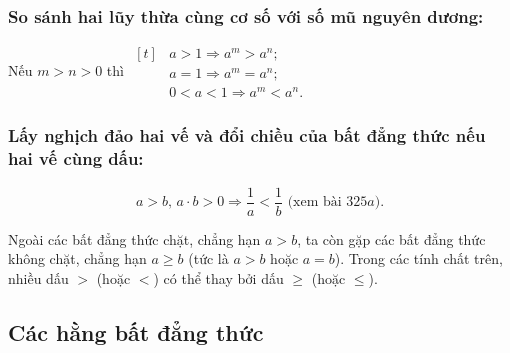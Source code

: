 \subsubsection{So sánh hai lũy thừa cùng cơ số với số mũ nguyên dương:}
Nếu $m>n>0$ thì $\begin{aligned}[t]
	&a>1\Rightarrow a^m>a^n;\\
	&a=1\Rightarrow a^m=a^n;\\
	&0<a<1\Rightarrow a^m<a^n.
\end{aligned}$
\subsubsection{Lấy nghịch đảo hai vế và đổi chiều của bất đẳng thức nếu hai vế cùng dấu:}
$$a>b,\, a\cdot b>0\Rightarrow \dfrac{1}{a}<\dfrac{1}{b}\text{ (xem bài $325a$)}.$$
\begin{note}
	Ngoài các bất đẳng thức chặt, chẳng hạn $a>b$, ta còn gặp các bất đẳng thức không chặt, chẳng hạn $a\geq b$ (tức là $a>b$ hoặc $a=b$). Trong các tính chất trên, nhiều dấu $>$ (hoặc $<$) có thể thay bởi dấu $\geq$ (hoặc $\leq$).
\end{note}
\subsection{Các hằng bất đẳng thức}
